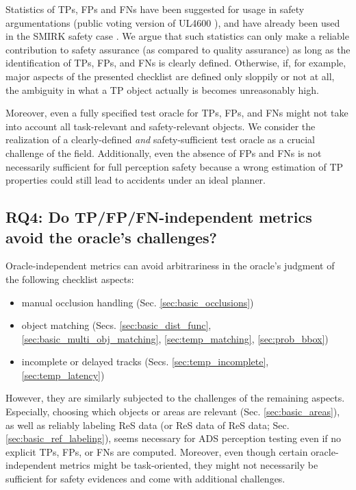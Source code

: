 \documentclass[conference]{IEEEtran}
\begin{document}
Statistics of TPs, FPs and FNs have been suggested for usage in safety argumentations (public voting version of UL4600 \cite[Sec. 8.4.1.2]{UL4600_voting_2019}), and have already been used in the SMIRK safety case \cite[Sec. 6.3.1]{Borg2022smirk}.
We argue that such statistics can only make a reliable contribution to safety assurance (as compared to quality assurance) as long as the identification of TPs, FPs, and FNs is clearly defined. 
Otherwise, if, for example, major aspects of the presented checklist are defined only sloppily or not at all, the ambiguity in what a TP object actually is becomes unreasonably high. 

Moreover, even a fully specified test oracle for TPs, FPs, and FNs might not take into account all task-relevant and safety-relevant objects. 
We consider the realization of a clearly-defined \textit{and} safety-sufficient test oracle as a crucial challenge of the field.
Additionally, even the absence of FPs and FNs is not necessarily sufficient for full perception safety because a wrong estimation of TP properties could still lead to accidents under an ideal planner.

\subsection{RQ4: Do TP/FP/FN-independent metrics avoid the \newline oracle's challenges?}
\label{sec:discussion_rq4}

Oracle-independent metrics %
can avoid arbitrariness in the oracle's judgment of the following checklist aspects:
\begin{itemize}
\item manual occlusion handling (Sec. \ref{sec:basic_occlusions})
\item object matching (Secs. \ref{sec:basic_dist_func}, \ref{sec:basic_multi_obj_matching},
\ref{sec:temp_matching},
 \ref{sec:prob_bbox})
\item incomplete or delayed tracks (Secs. \ref{sec:temp_incomplete}, \ref{sec:temp_latency})
\end{itemize}
However, they are similarly subjected to the challenges of the remaining aspects.
Especially, choosing which objects or areas are relevant (Sec. \ref{sec:basic_areas}), as well as reliably labeling ReS data (or ReS data of ReS data; Sec. \ref{sec:basic_ref_labeling}), seems necessary for ADS perception testing even if no explicit TPs, FPs, or FNs are computed. %
Moreover, even though certain oracle-independent metrics might be task-oriented, %
they might not necessarily be sufficient for safety evidences and come with additional challenges.
\end{document}
